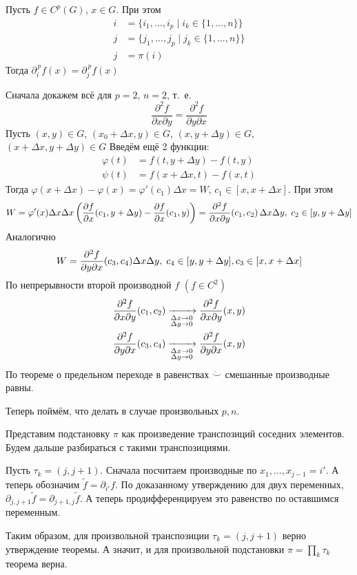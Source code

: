 \documentclass[12pt,timbord]{../../../notes}
\begin{document}
\begin{thrm}
  \label{thrm:diffspace::highpartial::permut}
  Пусть \mbox{$f \in C^p(G)$}, $x\in G$. При этом
  \[
    \begin{split}
      i &= \{ i_1, \dotsc, i_p \mid i_k \in \{1, \dotsc, n\}\} \\
      j &= \{ j_1, \dotsc, j_p \mid j_k \in \{1, \dotsc, n\}\} \\
      j &= \pi(i)
    \end{split}
  \]
  Тогда 
  $\partial_i^{\,p} f(x) = \partial_j^{\,p} f(x)$
\end{thrm}
\begin{ittproof}
  Сначала докажем всё для $p=2$, $n=2$, т.~е.
  \[
    \frac{\partial^2 f }{\partial x\partial y} =  \frac{\partial^2 f }{\partial y\partial x} 
  \]
  Пусть $(x, y) \in G$, $(x_0+ \Delta x, y) \in G$, $(x, y + \Delta y) \in G$,
  $(x + \Delta x, y + \Delta y) \in G$
  Введём ещё 2 функции:
  \begin{align*}
    \varphi(t) &= f(t, y+ \Delta y) - f(t, y) \\
    \psi(t) &= f(x+ \Delta x, t) - f(x, t)
  \end{align*}
  Тогда $\varphi(x+ \Delta x) - \varphi(x) = \varphi'(c_1) \Delta x = W$, 
  $c_1 \in [x, x+ \Delta x]$. При этом 
  \[
    W = \varphi'(x) \Delta x 
    \Delta x \left(\frac{\partial f}{\partial x} (c_1, y+ \Delta y) - \frac{\partial f}{\partial x} (c_1, y)\right) =  
    \frac{\partial^2 f}{\partial x \partial y} (c_1, c_2) \, \Delta x \Delta y, \; c_2 \in [y, y+ \Delta y]
  \] 
  Аналогично
  \[
    W = \frac{\partial^2 f}{\partial y \partial x} (c_3, c_4) \Delta x \Delta y, \; c_4 \in [y, y+ \Delta y], 
    c_3 \in [x, x+ \Delta x]
  \]
  По непрерывности второй производной $f$ $(f \in C^2)$
  \begin{align*}
    \frac{\partial^2 f}{\partial x \partial y} (c_1, c_2) \xrightarrow[\substack{\Delta x \to 0 \\ \Delta y \to 0}]{} 
    \frac{\partial^2 f}{\partial x \partial y} (x, y) \\
    \frac{\partial^2 f}{\partial y \partial x}(c_3, c_4) \xrightarrow[\substack{\Delta x \to 0 \\ \Delta y \to 0}]{} 
    \frac{\partial^2 f}{\partial y \partial x}(x, y)
  \end{align*}
  По теореме о предельном переходе в равенствах $\ddot\smile$ смешанные производные равны.

  Теперь поймём, что делать в случае произвольных $p, n$. 

  Представим подстановку $\pi$ как произведение транспозиций соседних элементов. Будем дальше
  разбираться с такими транспозициями. 
  
  Пусть $\tau_k = (j,j+1)$. Сначала посчитаем производные по $x_1, \dotsc, x_{j-1} = i'$.
  А теперь обозначим $\widetilde{f} = \partial_{i'} f$. По доказанному утверждению для двух
  переменных, $\partial_{j,j+1} \widetilde{f} = \partial_{j+1,j} \widetilde{f} $. А теперь
  продифференцируем это равенство по оставшимся переменным.

  Таким образом, для произвольной транспозиции $\tau_k = (j, j+1)$ верно утверждение теоремы. 
  А значит, и для произвольной подстановки $\pi = \prod_k \tau_k$ теорема верна. 
\end{ittproof}
\end{document}
